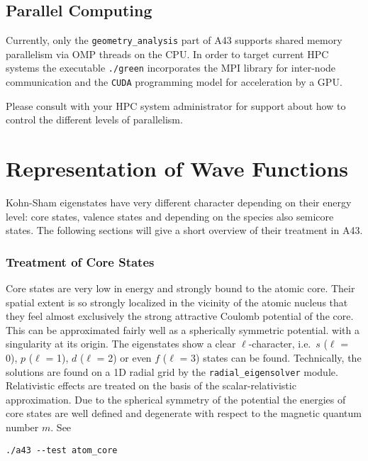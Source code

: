 \documentclass[oribibl]{llncs}
\newcommand{\ttt}[1]{\texttt{#1}}
\newcommand{\codename}{A43}
\begin{document}
\subsection{Parallel Computing} \label{sec:parallelization}
%
Currently, only the \ttt{geometry\_analysis} part of \codename{} supports shared memory parallelism 
via \ac{OMP} threads on the \ac{CPU}.
In order to target current \ac{HPC} systems 
the executable \ttt{./green} incorporates the \ac{MPI} library
for inter-node communication
and the \ttt{CUDA} programming model for acceleration by a \ac{GPU}.

\noindent
Please consult with your \ac{HPC} system administrator for support
about how to control the different levels of parallelism.

\section{Representation of Wave Functions} \label{sec:representation}
%
Kohn-Sham eigenstates have very different character depending on their energy level: core states, valence states and depending on the species also semicore states. The following sections will give a short overview of their treatment in \codename{}.
%
%
\subsubsection{Treatment of Core States} \label{sec:core-states}
%
Core states are very low in energy and strongly bound 
to the atomic core.
Their spatial extent is so strongly localized 
in the vicinity of the atomic nucleus 
that they feel almost exclusively the strong attractive Coulomb potential of the core. 
This can be approximated fairly well as a spherically symmetric potential.
with a singularity at its origin.
The eigenstates show a clear $\ell$-character, 
i.e.~$s$ ($\ell$ = 0), $p$ ($\ell$ = 1), $d$ ($\ell$ = 2) or even $f$ ($\ell$ = 3) states can be found.
Technically, the solutions are found on a 1D radial grid by the \ttt{radial\_eigensolver} module.
Relativistic effects are treated on the basis of the scalar-relativistic approximation.
Due to the spherical symmetry of the potential
the energies of core states are well defined and degenerate with respect to the magnetic quantum number $m$.
See
\begin{verbatim}
./a43 --test atom_core
\end{verbatim}
%
%
\end{document}
